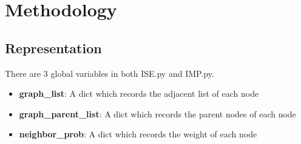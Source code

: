 \documentclass[conference,compsoc]{IEEEtran}
\begin{document}
%






\section{Methodology}

\subsection{Representation}
There are 3 global variables in both ISE.py and IMP.py.
\begin{itemize}

\item \textbf{graph\_{list}}: A dict which records the adjacent list of each node 

\item \textbf{graph\_{parent\_{list}}}: A dict which records the parent nodes of each node

\item \textbf{neighbor\_{prob}}: A dict which records the weight of each node
\end{itemize}
\end{document}
